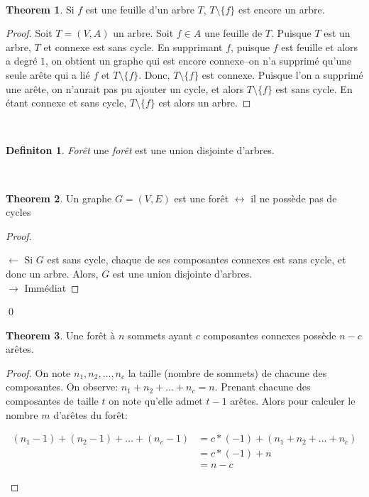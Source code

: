 \documentclass[french]{article}
\theoremstyle{definition}
\newtheorem{definition}{Definiton}[subsection]
\newtheorem{theorem}{Theorem}[section]
\begin{document}
		\
		\begin{theorem}{Si $f$ est une feuille d'un arbre $T$, $T \setminus \{f\}$ est encore un arbre.}
			\begin{proof}
				Soit $T = (V, A)$ un arbre. Soit $f \in A$ une feuille de $T$. Puisque $T$ est un arbre, $T$ et connexe est sans cycle. En supprimant $f$, puisque $f$ est feuille et alors a degré $1$, on obtient un graphe qui est encore connexe--on n'a supprimé qu'une seule arête qui a lié $f$ et $T \setminus \{f\}$. Donc, $T \setminus \{f\}$ est connexe. Puisque l'on a supprimé une arête, on n'aurait pas pu ajouter un cycle, et alors $T \setminus \{f\}$ est sans cycle. En étant connexe et sans cycle, $T \setminus \{f\}$ est alors un arbre. 
			\end{proof}
		\end{theorem}
		\
		\begin{definition}{\textit{Forêt}} une \textit{forêt} est une union disjointe d'arbres.
		\end{definition}
		\
		\begin{theorem}{Un graphe $G = (V, E)$ est une forêt $\leftrightarrow$ il ne possède pas de cycles}
			\begin{proof}
				\
				
				$\leftarrow$ Si $G$ est sans cycle, chaque de ses composantes connexes est sans cycle, et donc un arbre. Alors, $G$ est une union disjointe d'arbres.\\
				$\to$ Immédiat
			\end{proof}
		\end{theorem}\qed
		\
		\begin{theorem}{Une forêt à $n$ sommets ayant $c$ composantes connexes possède $n - c$ arêtes.}
			\begin{proof}
				On note $n_1, n_2, \dots , n_c$ la taille (nombre de sommets) de chacune des composantes. On observe: $n_1 + n_2 + \dots + n_c = n$. Prenant chacune des composantes de taille $t$ on note qu'elle admet $t - 1$ arêtes. Alors pour calculer le nombre $m$ d'arêtes du forêt:
				\begin{center}
					\begin{align*}
						(n_1 - 1) + (n_2 - 1) + \dots + (n_c - 1) & = c*(-1) + (n_1 + n_2 + \dots + n_c)\\
						& = c*(-1) + n\\
						& = n - c
					\end{align*}
				\end{center}
			\end{proof}
		\end{theorem}
\end{document}
